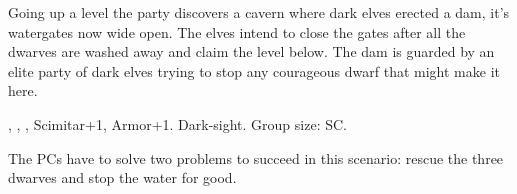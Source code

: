 {		Going up a level the party discovers a cavern where dark elves erected a dam, it's watergates now wide open. The elves intend to close the gates after all the dwarves are washed away and claim the level below. The dam is guarded by an elite party of dark elves trying to stop any courageous dwarf that might make it here.

		 , , , Scimitar+1, Armor+1. Dark-sight. Group size: SC.


		\noindent
		The PCs have to solve two problems to succeed in this scenario: rescue the three dwarves and stop the water for good.
}

